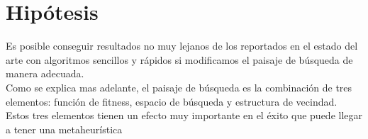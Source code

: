 \section{Hipótesis}
Es posible conseguir resultados no muy lejanos de los reportados en el estado del arte con algoritmos sencillos y rápidos si modificamos el paisaje de búsqueda de manera adecuada.\\
Como se explica mas adelante, el paisaje de búsqueda es la combinación de tres elementos: función de fitness, espacio de búsqueda y estructura de vecindad. Estos tres elementos tienen un efecto muy importante en el éxito que puede llegar a tener una metaheurística
